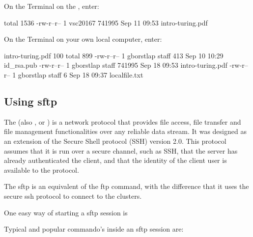 On the Terminal on the \hpc, enter:

\begin{prompt}
total 1536
-rw-r--r-- 1 vsc20167 741995 Sep 11 09:53 intro-turing.pdf
\end{prompt}

On the Terminal on your own local computer, enter:

\begin{prompt}
intro-turing.pdf 100%
total  899
-rw-r--r--   1 gborstlap  staff     413 Sep 10 10:29 id_rsa.pub
-rw-r--r--   1 gborstlap  staff  741995 Sep 18 09:53 intro-turing.pdf
-rw-r--r--   1 gborstlap  staff       6 Sep 18 09:37 localfile.txt
\end{prompt}

\subsection{Using sftp}

The  (also , or ) is a network protocol that provides file access,
file transfer and file management functionalities over any reliable data
stream. It was designed as an extension of the Secure Shell protocol (SSH)
version 2.0. This protocol assumes that it is run over a secure channel, such
as SSH, that the server has already authenticated the client, and that the
identity of the client user is available to the protocol.

The sftp is an equivalent of the ftp command, with the difference that it uses
the secure ssh protocol to connect to the clusters.

One easy way of starting a sftp session is
\begin{prompt}
\end{prompt}

Typical and popular commando's inside an sftp session are:

